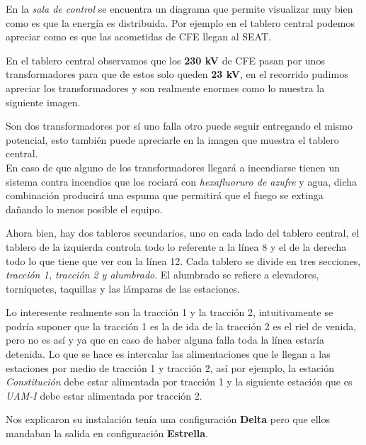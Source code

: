 \documentclass{mylib/reporte}
\begin{document}
En la \textit{sala de control} se encuentra un diagrama que permite visualizar muy bien como es que la energía es distribuida. Por ejemplo en el tablero central podemos apreciar como es que las acometidas de CFE llegan al SEAT.


En el tablero central observamos que los \textbf{230 kV} de CFE pasan por unos transformadores para que de estos solo queden \textbf{23 kV}, en el recorrido pudimos apreciar los transformadores y son realmente enormes como lo muestra la siguiente imagen.


Son dos transformadores por sí uno falla otro puede seguir entregando el mismo potencial, esto también puede apreciarle en la imagen que muestra el tablero central.\\

En caso de que alguno de los transformadores llegará a incendiarse tienen un sistema contra incendios que los rociará con \textit{hexafluoruro de azufre} y agua, dicha combinación producirá una espuma que permitirá que el fuego se extinga dañando lo menos posible el equipo.

Ahora bien, hay dos tableros secundarios, uno en cada lado del tablero central, el tablero de la izquierda controla todo lo referente a la línea 8 y el de la derecha todo lo que tiene que ver con la línea 12. Cada tablero se divide en tres secciones, \textit{tracción 1, tracción 2 y alumbrado}. El alumbrado se refiere a elevadores, torniquetes, taquillas y las lámparas de las estaciones.

Lo interesente realmente son la tracción 1 y la tracción 2, intuitivamente se podría suponer que la tracción 1 es la de ida de la tracción 2 es el riel de venida, pero no es así y ya que en caso de haber alguna falla toda la línea estaría detenida. Lo que se hace es intercalar las alimentaciones que le llegan a las estaciones por medio de tracción 1 y tracción 2, así por ejemplo, la estación \textit{Constitución} debe estar alimentada por tracción 1 y la siguiente estación que es \textit{UAM-I} debe estar alimentada por tracción 2.


Nos explicaron su instalación tenía una configuración {\large \textbf{Delta}} pero que ellos mandaban la salida en configuración {\large \textbf{Estrella}}.
\end{document}
